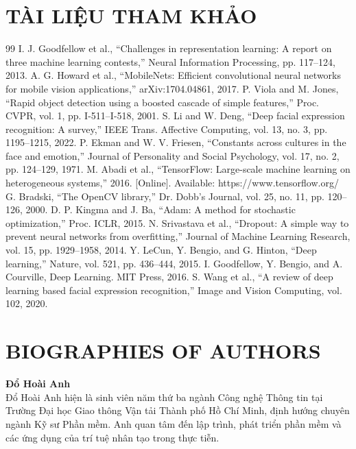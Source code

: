 \documentclass{iaesarticle}
\begin{document}
\section*{TÀI LIỆU THAM KHẢO}
\begin{thebibliography}{99}
 I. J. Goodfellow et al., ``Challenges in representation learning: A report on three machine learning contests,'' Neural Information Processing, pp. 117--124, 2013.
 A. G. Howard et al., ``MobileNets: Efficient convolutional neural networks for mobile vision applications,'' arXiv:1704.04861, 2017.
 P. Viola and M. Jones, ``Rapid object detection using a boosted cascade of simple features,'' Proc. CVPR, vol. 1, pp. I-511--I-518, 2001.
 S. Li and W. Deng, ``Deep facial expression recognition: A survey,'' IEEE Trans. Affective Computing, vol. 13, no. 3, pp. 1195--1215, 2022.
 P. Ekman and W. V. Friesen, ``Constants across cultures in the face and emotion,'' Journal of Personality and Social Psychology, vol. 17, no. 2, pp. 124--129, 1971.
 M. Abadi et al., ``TensorFlow: Large-scale machine learning on heterogeneous systems,'' 2016. [Online]. Available: https://www.tensorflow.org/
 G. Bradski, ``The OpenCV library,'' Dr. Dobb's Journal, vol. 25, no. 11, pp. 120--126, 2000.
 D. P. Kingma and J. Ba, ``Adam: A method for stochastic optimization,'' Proc. ICLR, 2015.
 N. Srivastava et al., ``Dropout: A simple way to prevent neural networks from overfitting,'' Journal of Machine Learning Research, vol. 15, pp. 1929--1958, 2014.
 Y. LeCun, Y. Bengio, and G. Hinton, ``Deep learning,'' Nature, vol. 521, pp. 436--444, 2015.
 I. Goodfellow, Y. Bengio, and A. Courville, Deep Learning. MIT Press, 2016.
 S. Wang et al., ``A review of deep learning based facial expression recognition,'' Image and Vision Computing, vol. 102, 2020.
\end{thebibliography}

\clearpage
\section*{BIOGRAPHIES OF AUTHORS}

\vspace{-.7em}
\small

\begin{biography}
\textbf{Đổ Hoài Anh}\\
Đổ Hoài Anh hiện là sinh viên năm thứ ba ngành Công nghệ Thông tin tại Trường Đại học Giao thông Vận tải Thành phố Hồ Chí Minh, định hướng chuyên ngành Kỹ sư Phần mềm. Anh quan tâm đến lập trình, phát triển phần mềm và các ứng dụng của trí tuệ nhân tạo trong thực tiễn.
\end{biography}
\end{document}
